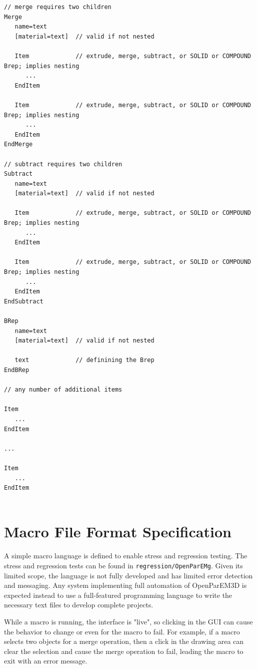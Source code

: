 \documentclass[titlepage]{article}
\renewcommand\_{\textunderscore\linebreak[1]}
\begin{document}
\begin{Verbatim}[fontsize=\small]
// merge requires two children
Merge
   name=text
   [material=text]  // valid if not nested

   Item             // extrude, merge, subtract, or SOLID or COMPOUND Brep; implies nesting
      ...
   EndItem

   Item             // extrude, merge, subtract, or SOLID or COMPOUND Brep; implies nesting
      ...
   EndItem
EndMerge

// subtract requires two children 
Subtract
   name=text
   [material=text]  // valid if not nested

   Item             // extrude, merge, subtract, or SOLID or COMPOUND Brep; implies nesting
      ...
   EndItem

   Item             // extrude, merge, subtract, or SOLID or COMPOUND Brep; implies nesting
      ...
   EndItem
EndSubtract

BRep
   name=text
   [material=text]  // valid if not nested

   text             // definining the Brep
EndBRep

// any number of additional items

Item
   ...
EndItem

...

Item
   ...
EndItem


\end{Verbatim}

\newpage
\section{Macro File Format Specification}
\label{sec:macro_file_spec}

A simple macro language is defined to enable stress and regression testing.  The stress and regression tests can be found in \texttt{regression/OpenParEMg}. Given its limited scope, the language is not fully developed and has limited error detection and messaging. Any system implementing full automation of OpenParEM3D is expected instead to use a full-featured programming language to write the necessary text files to develop complete projects.

While a macro is running, the interface is "live", so clicking in the GUI can cause the behavior to change or even for the macro to fail.  For example, if a macro selects two objects for a merge operation, then a click in the drawing area can clear the selection and cause the merge operation to fail, leading the macro to exit with an error message.
\end{document}
